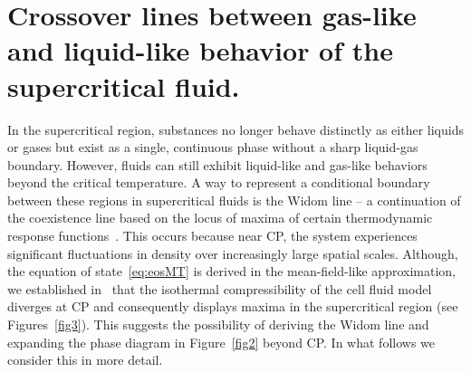 


\section{\label{sec:widom} Crossover lines between gas-like and liquid-like behavior of the supercritical fluid.}

In the supercritical region, substances no longer behave distinctly as either liquids or gases but exist as a single, continuous phase without a sharp liquid-gas boundary. However, fluids can still exhibit liquid-like and gas-like behaviors beyond the critical temperature. A way to represent a conditional boundary between these regions in supercritical fluids is the Widom line \--- a continuation of the coexistence line based on the locus of maxima of certain thermodynamic response functions~\cite{XKBetal05,MS10,SBGetal10}. This occurs because near CP, the system experiences significant fluctuations in density over increasingly large spatial scales. Although, the equation of state~\eqref{eq:eosMT} is derived in the mean-field-like approximation, we established in~\cite{DKRP24arxiv,DKRP24} that the isothermal compressibility of the cell fluid model diverges at CP and consequently displays maxima in the supercritical region (see Figures~\ref{fig3}). This suggests the possibility of deriving the Widom line and expanding the phase diagram in Figure~\ref{fig2} beyond CP.
In what follows we consider this in more detail.

